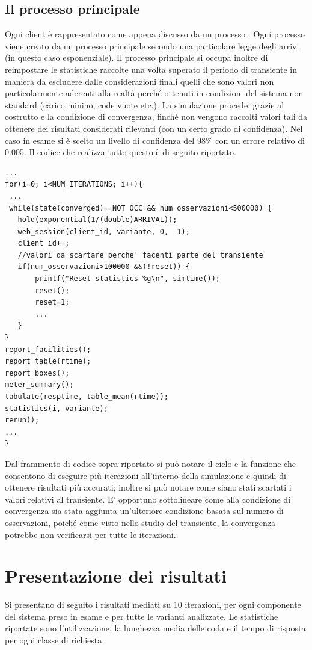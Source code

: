 \subsection{Il processo principale}
Ogni client è rappresentato come appena discusso da un processo . Ogni processo viene creato da un processo principale secondo una particolare legge degli arrivi (in questo caso esponenziale). Il processo principale si occupa inoltre di reimpostare le statistiche raccolte una volta superato il periodo di transiente in maniera da escludere dalle considerazioni finali quelli che sono valori non particolarmente aderenti alla realtà perché ottenuti in condizioni del sistema non standard (carico minino, code vuote etc.). La simulazione procede, grazie al costrutto  e la condizione di convergenza, finché non vengono raccolti valori tali da ottenere dei risultati considerati rilevanti (con un certo grado di confidenza). Nel caso in esame si è scelto un livello di confidenza del 98\% con un errore relativo  di 0.005. Il codice che realizza tutto questo è di seguito riportato. 
\begin{lstlisting}
...
for(i=0; i<NUM_ITERATIONS; i++){
 ...
 while(state(converged)==NOT_OCC && num_osservazioni<500000) { 
   hold(exponential(1/(double)ARRIVAL)); 
   web_session(client_id, variante, 0, -1); 
   client_id++; 
   //valori da scartare perche' facenti parte del transiente
   if(num_osservazioni>100000 &&(!reset)) { 
       printf("Reset statistics %g\n", simtime()); 
       reset(); 
       reset=1; 
       ...
   } 
} 
report_facilities(); 
report_table(rtime); 
report_boxes(); 
meter_summary(); 
tabulate(resptime, table_mean(rtime)); 
statistics(i, variante); 
rerun();
...
}
\end{lstlisting}
Dal frammento di codice sopra riportato si può notare il ciclo  e la funzione  che consentono di eseguire più iterazioni all'interno della simulazione e quindi di ottenere risultati più accurati; inoltre si può notare come siano stati scartati i valori relativi al transiente. E' opportuno sottolineare come alla condizione di convergenza sia stata aggiunta un'ulteriore condizione basata sul numero di osservazioni, poiché come visto nello studio del transiente, la convergenza potrebbe non verificarsi per tutte le iterazioni.

\section{Presentazione dei risultati}
Si presentano di seguito i risultati mediati su 10 iterazioni, per ogni componente del sistema preso in esame e per tutte le varianti analizzate. Le statistiche riportate sono l'utilizzazione, la lunghezza media delle coda e il tempo di risposta per ogni classe di richiesta.

